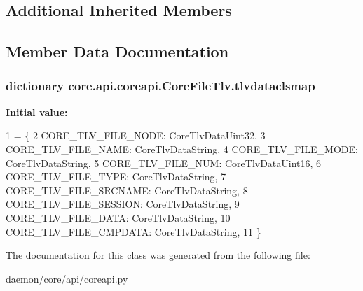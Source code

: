 \subsection*{Additional Inherited Members}


\subsection{Member Data Documentation}
\hypertarget{classcore_1_1api_1_1coreapi_1_1_core_file_tlv_a2ee0cf6289f87243e3019a305ad3667d}{
\subsubsection[{tlvdataclsmap}]{\setlength{\rightskip}{0pt plus 5cm}dictionary core.\+api.\+coreapi.\+Core\+File\+Tlv.\+tlvdataclsmap\hspace{0.3cm}{\ttfamily [static]}}}\label{classcore_1_1api_1_1coreapi_1_1_core_file_tlv_a2ee0cf6289f87243e3019a305ad3667d}
{\bfseries Initial value\+:}
\begin{DoxyCode}
1 = \{
2         CORE\_TLV\_FILE\_NODE: CoreTlvDataUint32,
3         CORE\_TLV\_FILE\_NAME: CoreTlvDataString,
4         CORE\_TLV\_FILE\_MODE: CoreTlvDataString,
5         CORE\_TLV\_FILE\_NUM: CoreTlvDataUint16,
6         CORE\_TLV\_FILE\_TYPE: CoreTlvDataString,
7         CORE\_TLV\_FILE\_SRCNAME: CoreTlvDataString,
8         CORE\_TLV\_FILE\_SESSION: CoreTlvDataString,
9         CORE\_TLV\_FILE\_DATA: CoreTlvDataString,
10         CORE\_TLV\_FILE\_CMPDATA: CoreTlvDataString,
11     \}
\end{DoxyCode}


The documentation for this class was generated from the following file\+:\begin{DoxyCompactItemize}
\item 
daemon/core/api/coreapi.\+py\end{DoxyCompactItemize}
